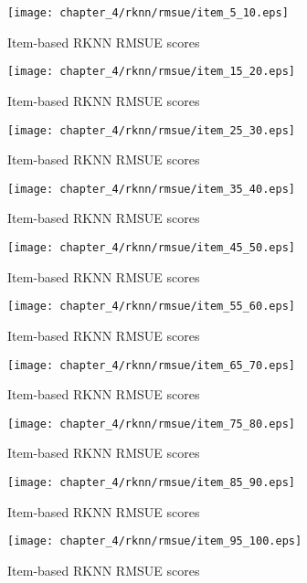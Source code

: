 \begin{figure}[H]
\centering
\texttt{[image: chapter\_4/rknn/rmsue/item\_5\_10.eps]}
\caption{Item-based RKNN RMSUE scores}
\end{figure}

\begin{figure}[H]
\centering
\texttt{[image: chapter\_4/rknn/rmsue/item\_15\_20.eps]}
\caption{Item-based RKNN RMSUE scores}
\end{figure}

\begin{figure}[H]
\centering
\texttt{[image: chapter\_4/rknn/rmsue/item\_25\_30.eps]}
\caption{Item-based RKNN RMSUE scores}
\end{figure}

\begin{figure}[H]
\centering
\texttt{[image: chapter\_4/rknn/rmsue/item\_35\_40.eps]}
\caption{Item-based RKNN RMSUE scores}
\end{figure}

\begin{figure}[H]
\centering
\texttt{[image: chapter\_4/rknn/rmsue/item\_45\_50.eps]}
\caption{Item-based RKNN RMSUE scores}
\end{figure}

\begin{figure}[H]
\centering
\texttt{[image: chapter\_4/rknn/rmsue/item\_55\_60.eps]}
\caption{Item-based RKNN RMSUE scores}
\end{figure}

\begin{figure}[H]
\centering
\texttt{[image: chapter\_4/rknn/rmsue/item\_65\_70.eps]}
\caption{Item-based RKNN RMSUE scores}
\end{figure}

\begin{figure}[H]
\centering
\texttt{[image: chapter\_4/rknn/rmsue/item\_75\_80.eps]}
\caption{Item-based RKNN RMSUE scores}
\end{figure}

\begin{figure}[H]
\centering
\texttt{[image: chapter\_4/rknn/rmsue/item\_85\_90.eps]}
\caption{Item-based RKNN RMSUE scores}
\end{figure}

\begin{figure}[H]
\centering
\texttt{[image: chapter\_4/rknn/rmsue/item\_95\_100.eps]}
\caption{Item-based RKNN RMSUE scores}
\end{figure}

